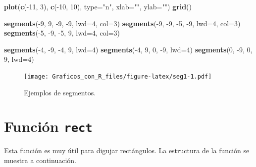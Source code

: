 \documentclass[10pt,]{krantz}
\makeatletter
\newenvironment{Shaded}{\begin{snugshade}}{\end{snugshade}}
\newcommand{\KeywordTok}[1]{\textcolor[rgb]{0.13,0.29,0.53}{\textbf{{#1}}}}
\newcommand{\DataTypeTok}[1]{\textcolor[rgb]{0.13,0.29,0.53}{{#1}}}
\newcommand{\DecValTok}[1]{\textcolor[rgb]{0.00,0.00,0.81}{{#1}}}
\newcommand{\StringTok}[1]{\textcolor[rgb]{0.31,0.60,0.02}{{#1}}}
\newcommand{\NormalTok}[1]{{#1}}
\newenvironment{kframe}{%
\medskip{}
\setlength{\fboxsep}{.8em}
 \def\at@end@of@kframe{}%
 \ifinner\ifhmode%
  \def\at@end@of@kframe{\end{minipage}}%
  \begin{minipage}{\columnwidth}%
 \fi\fi%
 \def\FrameCommand##1{\hskip\@totalleftmargin \hskip-\fboxsep
 \colorbox{shadecolor}{##1}\hskip-\fboxsep
     \hskip-\linewidth \hskip-\@totalleftmargin \hskip\columnwidth}%
 \MakeFramed {\advance\hsize-\width
   \@totalleftmargin\z@ \linewidth\hsize
   \@setminipage}}%
 {\par\unskip\endMakeFramed%
 \at@end@of@kframe}
\renewenvironment{Shaded}{\begin{kframe}}{\end{kframe}}
\makeatother
\begin{document}
\begin{Shaded}
\begin{Highlighting}[]
\KeywordTok{plot}\NormalTok{(}\KeywordTok{c}\NormalTok{(-}\DecValTok{11}\NormalTok{, }\DecValTok{3}\NormalTok{), }\KeywordTok{c}\NormalTok{(-}\DecValTok{10}\NormalTok{, }\DecValTok{10}\NormalTok{), }\DataTypeTok{type=}\StringTok{"n"}\NormalTok{, }\DataTypeTok{xlab=}\StringTok{""}\NormalTok{, }\DataTypeTok{ylab=}\StringTok{""}\NormalTok{)}
\KeywordTok{grid}\NormalTok{()}

\KeywordTok{segments}\NormalTok{(-}\DecValTok{9}\NormalTok{, }\DecValTok{9}\NormalTok{, -}\DecValTok{9}\NormalTok{, -}\DecValTok{9}\NormalTok{, }\DataTypeTok{lwd=}\DecValTok{4}\NormalTok{, }\DataTypeTok{col=}\DecValTok{3}\NormalTok{)}
\KeywordTok{segments}\NormalTok{(-}\DecValTok{9}\NormalTok{, -}\DecValTok{9}\NormalTok{, -}\DecValTok{5}\NormalTok{, -}\DecValTok{9}\NormalTok{, }\DataTypeTok{lwd=}\DecValTok{4}\NormalTok{, }\DataTypeTok{col=}\DecValTok{3}\NormalTok{)}
\KeywordTok{segments}\NormalTok{(-}\DecValTok{5}\NormalTok{, -}\DecValTok{9}\NormalTok{, -}\DecValTok{5}\NormalTok{, }\DecValTok{9}\NormalTok{, }\DataTypeTok{lwd=}\DecValTok{4}\NormalTok{, }\DataTypeTok{col=}\DecValTok{3}\NormalTok{)}

\KeywordTok{segments}\NormalTok{(-}\DecValTok{4}\NormalTok{, -}\DecValTok{9}\NormalTok{, -}\DecValTok{4}\NormalTok{, }\DecValTok{9}\NormalTok{, }\DataTypeTok{lwd=}\DecValTok{4}\NormalTok{)}
\KeywordTok{segments}\NormalTok{(-}\DecValTok{4}\NormalTok{, }\DecValTok{9}\NormalTok{, }\DecValTok{0}\NormalTok{, -}\DecValTok{9}\NormalTok{, }\DataTypeTok{lwd=}\DecValTok{4}\NormalTok{)}
\KeywordTok{segments}\NormalTok{(}\DecValTok{0}\NormalTok{, -}\DecValTok{9}\NormalTok{, }\DecValTok{0}\NormalTok{, }\DecValTok{9}\NormalTok{, }\DataTypeTok{lwd=}\DecValTok{4}\NormalTok{)}
\end{Highlighting}
\end{Shaded}

\begin{figure}[htbp]
\centering
\texttt{[image: Graficos\_con\_R\_files/figure-latex/seg1-1.pdf]}
\caption{\label{fig:seg1}Ejemplos de segmentos.}
\end{figure}

\section{\texorpdfstring{Función \texttt{rect} 
}{Función rect  }}\label{funcion-rect}

Esta función es muy útil para digujar rectángulos. La estructura de la
función se muestra a continuación.
\end{document}
